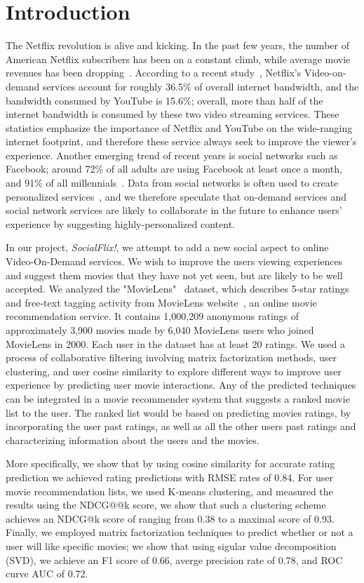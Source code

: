 \section{Introduction}
\label{sec:intro}

The Netflix revolution is alive and kicking. 
In the past few years, the number of American Netflix subscribers has been on a constant climb, while average movie revenues has been dropping~\cite{MisixNetflix}.
According to a recent study~\cite{VarietyNetflixBandwidth}, Netflix's Video-on-demand services account for roughly 36.5\% of overall internet bandwidth, and the bandwidth consumed by YouTube is 15.6\%; overall, more than half of the internet bandwidth is consumed by these two video streaming services.
These statistics emphasize the importance of Netflix and YouTube on the wide-ranging internet footprint, and therefore these service always seek to improve the viewer's experience.
Another emerging trend of recent years is social networks such as Facebook; around 72\% of all adults are using Facebook at least once a month, and 91\% of all millennials~\cite{FacebookStats}. 
Data from social networks is often used to create personalized services~\cite{carmel2009personalized}, and we therefore speculate that on-demand services and social network services are likely to collaborate in the future to enhance users' experience by suggesting highly-personalized content.

In our project, \textit{SocialFlix!}, we attempt to add a new social aspect to online Video-On-Demand services. 
We wish to improve the users viewing experiences and suggest them movies that they have not yet seen, but are likely to be well accepted.
We analyzed the "MovieLens"~\cite{GroupLens} dataset, which describes 5-star ratings and free-text tagging activity from MovieLens website~\cite{MovieLens}, an online movie recommendation service. It contains 1,000,209 anonymous ratings of approximately 3,900 movies made by 6,040 MovieLens users who joined MovieLens in 2000. Each user in the dataset has at least 20 ratings. 
We used a process of collaborative filtering involving matrix factorization methods, user clustering, and user cosine similarity to explore different ways to improve user experience by predicting user movie interactions. 
Any of the predicted techniques can be integrated in a movie recommender system that suggests a ranked movie list to the user. 
The ranked list would be based on predicting movies ratings, by incorporating the user past ratings, as well as all the other users past ratings and characterizing information about the users and the movies. 

More specifically, we show that by using cosine similarity for accurate rating prediction we achieved rating predictions with RMSE rates of 0.84. 
For user movie recommendation lists, we used K-means clustering, and measured the results using the NDCG@@k score, we show that such a clustering scheme achieves an NDCG@k score of ranging from 0.38 to a maximal score of 0.93.
Finally, we employed matrix factorization techniques to predict whether or not a user will like specific movies; we show that using sigular value decomposition (SVD), we achieve an F1 score of 0.66, averge precision rate of 0.78, and ROC curve AUC of 0.72.
